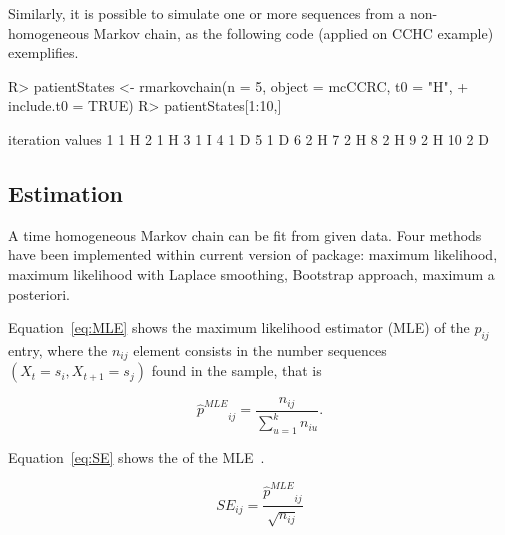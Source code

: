 \documentclass[nojss]{jss}
\begin{document}
Similarly, it is possible to simulate one or more sequences from a non-homogeneous Markov chain, 
as the following code (applied on CCHC example) exemplifies.

\begin{Schunk}
\begin{Sinput}
R> patientStates <- rmarkovchain(n = 5, object = mcCCRC, t0 = "H", 
+                                include.t0 = TRUE)
R> patientStates[1:10,]
\end{Sinput}
\begin{Soutput}
   iteration values
1          1      H
2          1      H
3          1      I
4          1      D
5          1      D
6          2      H
7          2      H
8          2      H
9          2      H
10         2      D
\end{Soutput}
\end{Schunk}

\subsection{Estimation}

A time homogeneous Markov chain can be fit from given data. Four methods have been implemented within current version of
 package: maximum likelihood, maximum likelihood with Laplace
smoothing, Bootstrap approach, maximum a posteriori. 

Equation~\ref{eq:MLE} shows the maximum likelihood estimator (MLE) of the
$p_{ij}$ entry, where the $n_{ij}$ element consists in the number sequences $\left( X_{t}=s_{i}, X_{t+1}=s_{j}\right)$
found in the sample, that is

\begin{equation}
{\hat p^{MLE}}_{ij} = \frac{{{n_{ij}}}}{{\sum\limits_{u = 1}^k {{n_{iu}}} }}.
\label{eq:MLE}
\end{equation}

Equation~\ref{eq:SE} shows the  of the MLE~\citep{MSkuriat}.

\begin{equation}
SE_{ij} = \frac{ {\hat p^{MLE}}_{ij} }{\sqrt{n_{ij}}}
\label{eq:SE}
\end{equation}
\end{document}
